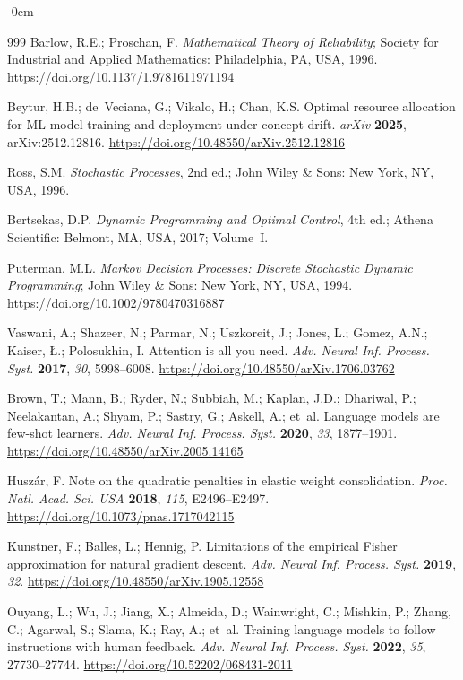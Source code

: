 \documentclass[electronics,article,submit,pdftex,moreauthors]{Definitions/mdpi}
\begin{document}
\begin{adjustwidth}{-\extralength}{0cm}
\begin{thebibliography}{999}
Barlow, R.E.; Proschan, F. {\em Mathematical Theory of Reliability}; Society for Industrial and Applied Mathematics: Philadelphia, PA, USA, 1996. \url{https://doi.org/10.1137/1.9781611971194}

Beytur, H.B.; de~Veciana, G.; Vikalo, H.; Chan, K.S. Optimal resource allocation for ML model training and deployment under concept drift. {\em arXiv} {\bf 2025}, arXiv:2512.12816. \url{https://doi.org/10.48550/arXiv.2512.12816}

Ross, S.M. {\em Stochastic Processes}, 2nd ed.; John Wiley \& Sons: New York, NY, USA, 1996.

Bertsekas, D.P. {\em Dynamic Programming and Optimal Control}, 4th ed.; Athena Scientific: Belmont, MA, USA, 2017; Volume~I.

Puterman, M.L. {\em Markov Decision Processes: Discrete Stochastic Dynamic Programming}; John Wiley \& Sons: New York, NY, USA, 1994. \url{https://doi.org/10.1002/9780470316887}

Vaswani, A.; Shazeer, N.; Parmar, N.; Uszkoreit, J.; Jones, L.; Gomez, A.N.; Kaiser, {\L}.; Polosukhin, I. Attention is all you need. {\em Adv. Neural Inf. Process. Syst.} {\bf 2017}, {\em 30}, 5998--6008. \url{https://doi.org/10.48550/arXiv.1706.03762}

Brown, T.; Mann, B.; Ryder, N.; Subbiah, M.; Kaplan, J.D.; Dhariwal, P.; Neelakantan, A.; Shyam, P.; Sastry, G.; Askell, A.; et~al. Language models are few-shot learners. {\em Adv. Neural Inf. Process. Syst.} {\bf 2020}, {\em 33}, 1877--1901. \url{https://doi.org/10.48550/arXiv.2005.14165}

Husz\'ar, F. Note on the quadratic penalties in elastic weight consolidation. {\em Proc. Natl. Acad. Sci. USA} {\bf 2018}, {\em 115}, E2496--E2497. \url{https://doi.org/10.1073/pnas.1717042115}

Kunstner, F.; Balles, L.; Hennig, P. Limitations of the empirical Fisher approximation for natural gradient descent. {\em Adv. Neural Inf. Process. Syst.} {\bf 2019}, {\em 32}. \url{https://doi.org/10.48550/arXiv.1905.12558}

Ouyang, L.; Wu, J.; Jiang, X.; Almeida, D.; Wainwright, C.; Mishkin, P.; Zhang, C.; Agarwal, S.; Slama, K.; Ray, A.; et~al. Training language models to follow instructions with human feedback. {\em Adv. Neural Inf. Process. Syst.} {\bf 2022}, {\em 35}, 27730--27744. \url{https://doi.org/10.52202/068431-2011}


\end{thebibliography}
\end{adjustwidth}
\end{document}
